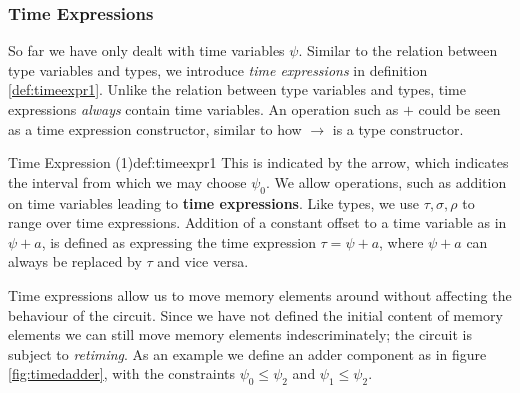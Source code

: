 \subsubsection{Time Expressions}
So far we have only dealt with time variables $\psi$.
Similar to the relation between type variables and types, we introduce \textit{time expressions} in definition \ref{def:timeexpr1}.
Unlike the relation between type variables and types, time expressions \textit{always} contain time variables. 
An operation such as $+$ could be seen as a time expression constructor, similar to how $\rightarrow$ is a type constructor.

\begin{definitiontitled}{Time Expression (1)}{def:timeexpr1}
This is indicated by the arrow, which indicates the interval from which we may choose $\psi_0$.
We allow operations, such as addition on time variables leading to \textbf{time expressions}.
Like types, we use $\tau, \sigma, \rho$ to range over time expressions.
Addition of a constant offset to a time variable as in $\psi + a$, is defined as expressing the time expression $\tau= \psi + a$, where $\psi + a$ can always be replaced by $\tau$ and vice versa.
\end{definitiontitled}

Time expressions allow us to move memory elements around without affecting the behaviour of the circuit.
Since we have not defined the initial content of memory elements we can still move memory elements indescriminately; the circuit is subject to \textit{retiming}.
As an example we define an adder component as in figure \ref{fig:timedadder}, with the constraints $\psi_0 \le \psi_2$ and $\psi_1 \le \psi_2$.

